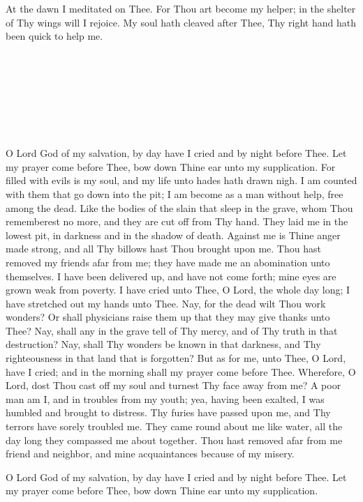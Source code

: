 \documentclass[
  14pt,
  letterpaper,
  openright,
  twocolumn,
  twoside]{memoir}
\begin{document}
At the dawn I meditated on Thee. For Thou art become my helper; in the shelter of Thy wings will I rejoice.  My soul hath cleaved after Thee, Thy right hand hath been quick to help me.

\glory\ \bothnow\

\alleluia\ \thrice\

\lhm\ \thrice\

\glory\ \bothnow\


O Lord God of my salvation, by day have I cried and by night before Thee. Let my prayer come before Thee, bow down Thine ear unto my supplication. For filled with evils is my soul, and my life unto hades hath drawn nigh. I am counted with them that go down into the pit; I am become as a man without help, free among the dead. Like the bodies of the slain that sleep in the grave, whom Thou rememberest no more, and they are cut off from Thy hand. They laid me in the lowest pit, in darkness and in the shadow of death. Against me is Thine anger made strong, and all Thy billows hast Thou brought upon me. Thou hast removed my friends afar from me; they have made me an abomination unto themselves. I have been delivered up, and have not come forth; mine eyes are grown weak from poverty. I have cried unto Thee, O Lord, the whole day long; I have stretched out my hands unto Thee. Nay, for the dead wilt Thou work wonders? Or shall physicians raise them up that they may give thanks unto Thee? Nay, shall any in the grave tell of Thy mercy, and of Thy truth in that destruction? Nay, shall Thy wonders be known in that darkness, and Thy righteousness in that land that is forgotten? But as for me, unto Thee, O Lord, have I cried; and in the morning shall my prayer come before Thee. Wherefore, O Lord, dost Thou cast off my soul and turnest Thy face away from me? A poor man am I, and in troubles from my youth; yea, having been exalted, I was humbled and brought to distress. Thy furies have passed upon me, and Thy terrors have sorely troubled me. They came round about me like water, all the day long they compassed me about together. Thou hast removed afar from me friend and neighbor, and mine acquaintances because of my misery.

O Lord God of my salvation, by day have I cried and by night before Thee. Let my prayer come before Thee, bow down Thine ear unto my supplication.

\end{document}
